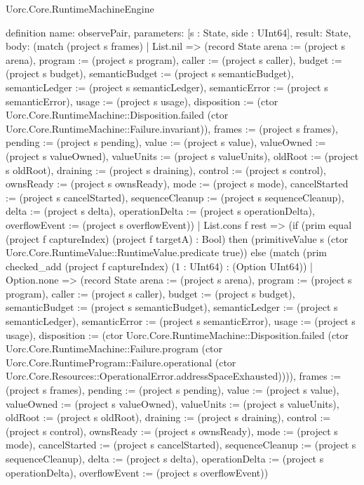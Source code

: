 \begin{lexlean}{Uorc.Core.RuntimeMachineEngine}
\begin{semanticmodule}
definition{
  name: observePair,
  parameters: [s : State, side : UInt64],
  result: State,
  body: (match (project s frames)
    | List.nil => (record State {arena := (project s arena), program := (project s program), caller := (project s caller), budget := (project s budget), semanticBudget := (project s semanticBudget), semanticLedger := (project s semanticLedger), semanticError := (project s semanticError), usage := (project s usage), disposition := (ctor Uorc.Core.RuntimeMachine::Disposition.failed (ctor Uorc.Core.RuntimeMachine::Failure.invariant)), frames := (project s frames), pending := (project s pending), value := (project s value), valueOwned := (project s valueOwned), valueUnits := (project s valueUnits), oldRoot := (project s oldRoot), draining := (project s draining), control := (project s control), ownsReady := (project s ownsReady), mode := (project s mode), cancelStarted := (project s cancelStarted), sequenceCleanup := (project s sequenceCleanup), delta := (project s delta), operationDelta := (project s operationDelta), overflowEvent := (project s overflowEvent)})
    | List.cons f rest => (if (prim equal (project f captureIndex) (project f targetA) : Bool) then (primitiveValue s (ctor Uorc.Core.RuntimeValue::RuntimeValue.predicate true)) else (match (prim checked_add (project f captureIndex) (1 : UInt64) : (Option UInt64))
      | Option.none => (record State {arena := (project s arena), program := (project s program), caller := (project s caller), budget := (project s budget), semanticBudget := (project s semanticBudget), semanticLedger := (project s semanticLedger), semanticError := (project s semanticError), usage := (project s usage), disposition := (ctor Uorc.Core.RuntimeMachine::Disposition.failed (ctor Uorc.Core.RuntimeMachine::Failure.program (ctor Uorc.Core.RuntimeProgram::Failure.operational (ctor Uorc.Core.Resources::OperationalError.addressSpaceExhausted)))), frames := (project s frames), pending := (project s pending), value := (project s value), valueOwned := (project s valueOwned), valueUnits := (project s valueUnits), oldRoot := (project s oldRoot), draining := (project s draining), control := (project s control), ownsReady := (project s ownsReady), mode := (project s mode), cancelStarted := (project s cancelStarted), sequenceCleanup := (project s sequenceCleanup), delta := (project s delta), operationDelta := (project s operationDelta), overflowEvent := (project s overflowEvent)})
}
\end{semanticmodule}
\end{lexlean}
